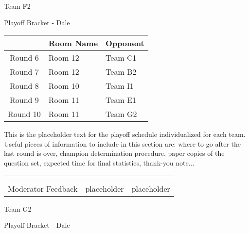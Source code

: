 \documentclass{article}%
\begin{document}
\newpage%
\begin{center}%
\begin{Huge}%
Team F2%
\end{Huge}%
\vspace*{12pt}%
\linebreak%
\begin{Large}%
Playoff Bracket {-} Dale%
\end{Large}%
\end{center}%
\vspace*{4pt}%
%
\begin{tabularx}{\textwidth}{|c|Y|Y|}%
\hline%
&Room Name&Opponent\\%
\hline%
Round 6&Room 12&Team C1\\%
Round 7&Room 12&Team B2\\%
Round 8&Room 10&Team I1\\%
Round 9&Room 11&Team E1\\%
Round 10&Room 11&Team G2\\%
\hline%
\end{tabularx}%
\vspace*{30pt}%
\linebreak%
This is the placeholder text for the playoff schedule individualized for each team. Useful pieces of information to include in this section are: where to go after the last round is over, champion determination procedure, paper copies of the question set, expected time for final statistics, thank{-}you note...%
\vspace*{30pt}%
\newline%
%
\begin{tabularx}{\textwidth}{YYY}%
  &  &  \\%
\\%
Moderator Feedback&placeholder&placeholder\\%
\end{tabularx}%
\newpage%
\begin{center}%
\begin{Huge}%
Team G2%
\end{Huge}%
\vspace*{12pt}%
\linebreak%
\begin{Large}%
Playoff Bracket {-} Dale%
\end{Large}%
\end{center}%
\end{document}
